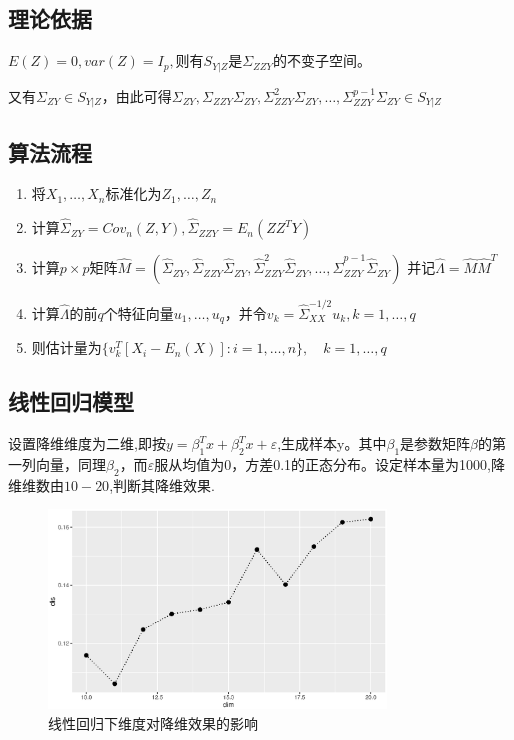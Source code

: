 \subsection{理论依据}
$E(Z)=0,var(Z)=I_p,$则有$S_{Y|Z}$是$\Sigma_{ZZY}$的不变子空间。

又有$\Sigma_{ZY} \in S_{Y|Z}$，由此可得$\Sigma_{ZY},\Sigma_{ZZY}\Sigma_{ZY},\Sigma_{ZZY}^2\Sigma_{ZY},\dots,\Sigma_{ZZY}^{p-1}\Sigma_{ZY} \in S_{Y|Z}$
\subsection{算法流程}
\begin{enumerate}
    \item 将$X_1,\dots,X_n$标准化为$Z_1,\dots,Z_n$
    \item 计算$\hat{\Sigma}_{ZY}=Cov_n(Z,Y),\hat{\Sigma}_{ZZY}=E_n(ZZ^TY)$
    \item 计算$p\times p$矩阵$\hat{M}=(\hat{\Sigma}_{ZY},\hat{\Sigma}_{ZZY}\hat{\Sigma}_{ZY},\hat{\Sigma}_{ZZY}^2\hat{\Sigma}_{ZY},\dots,\hat{\Sigma}_{ZZY}^{p-1}\hat{\Sigma}_{ZY})$
并记$\hat{\Lambda}=\hat{M}\hat{M}^T$
    \item 计算$\hat{\Lambda }$的前$q$个特征向量$u_1,\dots,u_q$，并令$v_k=\hat{\Sigma}_{XX}^{-1/2}u_k,k=1,\dots,q$
    \item 则估计量为$\{v_k^T[X_i-E_n(X)]:i=1,\dots,n\},\quad k=1,\dots,q$
\end{enumerate}
\subsection{线性回归模型}

设置降维维度为二维,即按$y=\beta_1^Tx+\beta_2^Tx+\varepsilon$,生成样本y。其中$\beta_1$是参数矩阵$\beta$的第一列向量，同理$\beta_2$，而$\varepsilon$服从均值为0，方差0.1的正态分布。设定样本量为1000,降维维数由$10-20$,判断其降维效果.
\begin{figure}[H]
    \centering
    \includegraphics[width=0.8\textwidth]{image/norm_iht.eps}
    \caption{线性回归下维度对降维效果的影响}
\end{figure}




